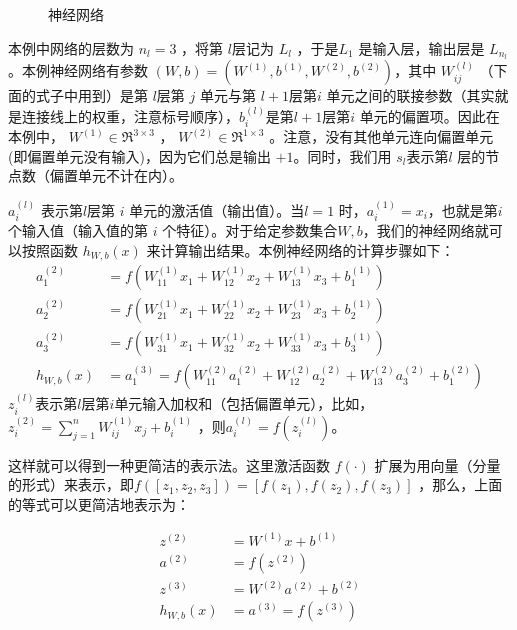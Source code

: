\begin{figure}
  \centering
  
  \caption{神经网络}
  \label{fig:network}  
\end{figure}


本例中网络的层数为 $ n_l=3$ ，将第 $ l $层记为 $ L_l$ ，于是$  L_1$ 是输入层，输出层是 $ L_{n_l} $。本例神经网络有参数 $ (W,b) = (W^{(1)}, b^{(1)}, W^{(2)}, b^{(2)}) $，其中 $ W^{(l)}_{ij}$ （下面的式子中用到）是第 $ l $层第 $ j$ 单元与第 $ l+1 $层第$  i$ 单元之间的联接参数（其实就是连接线上的权重，注意标号顺序），$ b^{(l)}_i $是第$  l+1 $层第$  i$ 单元的偏置项。因此在本例中， $ W^{(1)} \in \Re^{3\times 3}$ ， $ W^{(2)} \in \Re^{1\times 3}$ 。注意，没有其他单元连向偏置单元(即偏置单元没有输入)，因为它们总是输出 $ +1$。同时，我们用 $ s_l $表示第$  l$ 层的节点数（偏置单元不计在内）。

$ a^{(l)}_i$ 表示第$  l $层第 $ i$ 单元的激活值（输出值）。当$  l=1$ 时，$  a^{(1)}_i = x_i $，也就是第$  i $个输入值（输入值的第 $ i$ 个特征）。对于给定参数集合$  W,b $，我们的神经网络就可以按照函数 $ h_{W,b}(x)$ 来计算输出结果。本例神经网络的计算步骤如下：
\begin{align}
a_1^{(2)} &= f(W_{11}^{(1)}x_1 + W_{12}^{(1)} x_2 + W_{13}^{(1)} x_3 + b_1^{(1)})  \\
a_2^{(2)} &= f(W_{21}^{(1)}x_1 + W_{22}^{(1)} x_2 + W_{23}^{(1)} x_3 + b_2^{(1)})  \\
a_3^{(2)} &= f(W_{31}^{(1)}x_1 + W_{32}^{(1)} x_2 + W_{33}^{(1)} x_3 + b_3^{(1)})  \\
h_{W,b}(x) &= a_1^{(3)} =  f(W_{11}^{(2)}a_1^{(2)} + W_{12}^{(2)} a_2^{(2)} + W_{13}^{(2)} a_3^{(2)} + b_1^{(2)}) 
\end{align}
 $ z^{(l)}_i $表示第$ l $层第$  i$单元输入加权和（包括偏置单元），比如，$  z_i^{(2)} = \sum_{j=1}^n W^{(1)}_{ij} x_j + b^{(1)}_i$ ，则$  a^{(l)}_i = f(z^{(l)}_i) $。

这样就可以得到一种更简洁的表示法。这里激活函数 $ f(\cdot)$ 扩展为用向量（分量的形式）来表示，即$  f([z_1, z_2, z_3]) = [f(z_1), f(z_2), f(z_3)]$ ，那么，上面的等式可以更简洁地表示为：

\begin{align}
z^{(2)} &= W^{(1)} x + b^{(1)} \\
a^{(2)} &= f(z^{(2)}) \\
z^{(3)} &= W^{(2)} a^{(2)} + b^{(2)} \\
h_{W,b}(x) &= a^{(3)} = f(z^{(3)})
\end{align}

